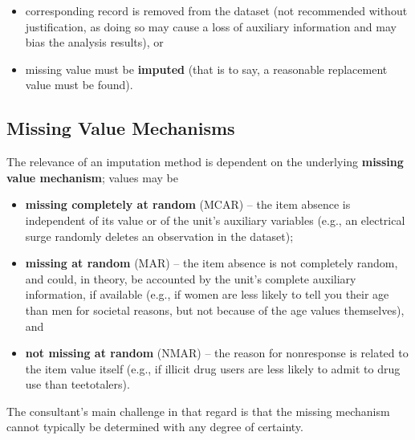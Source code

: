 \begin{itemize}[noitemsep]
\item corresponding record is removed from the dataset (not recommended without justification, as doing so may cause a loss of auxiliary information and may bias the analysis results), or 
\item missing value must be \textbf{imputed} (that is to say,  a reasonable replacement value must be found).
\end{itemize}
\subsection{Missing Value Mechanisms} The relevance of an imputation method is dependent on the underlying \textbf{missing value mechanism}; values may be 
\begin{itemize}[noitemsep]
\item \textbf{missing completely at random} (MCAR) -- the item absence is independent of its value or of the unit's auxiliary variables (e.g., an electrical surge randomly deletes an observation in the dataset); 
\item \textbf{missing at random} (MAR) -- the item absence is not completely random, and could, in theory, be accounted by the unit's complete auxiliary information, if available (e.g., if women are less likely to tell you their age than men for societal reasons, but not because of the age values themselves), and 
\item \textbf{not missing at random} (NMAR) -- the reason for nonresponse is related to the item value itself (e.g., if illicit drug users are less likely to admit to drug use than teetotalers).
\end{itemize}
The consultant's main challenge in that regard is that the missing mechanism cannot typically be determined with any degree of certainty.
